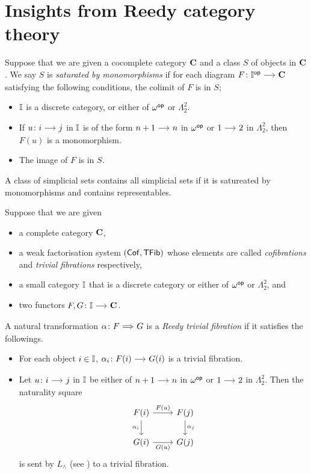 \documentclass[a4paper,  dvipsnames, 11pt]{amsart}
\begin{document}
\section{Insights from Reedy category theory}
\begin{definition}
	\label{defn:SatMono}
	Suppose that we are given a cocomplete category $\mathbf{C}$ and a class $S$ of objects in $\mathbf{C}$.
	We say $S$ is \emph{saturated by monomorphisms}
	if for each diagram $F\colon\dI^\op\arr\one{C}$ satisfying the following conditions,
	the colimit of $F$ is in $S$;
	\begin{itemize}
		\item %
			$\mathbb{I}$ is a discrete category, or either of
			$\omega^{\mathsf{op}}$ or $\Lambda^2_2$.
		\item %
			If $u\colon i\arr j$ in $\mathbb{I}$ is of the form $n+1\arr n$ in $\omega^{\mathsf{op}}$ or $1\arr 2$ in $\Lambda^2_2$,
			then $F(u)$ is a monomorphism.
		\item %
			The image of $F$ is in $S$.
		\qedhere %
	\end{itemize}
\end{definition}
\begin{fact}
	\label{fact:SatMono}
	A class of simplicial sets contains all simplicial sets
	if it is satureated by monomorphisms and contains representables.
\end{fact}
\begin{definition}
	\label{defn:ReedyTrivFib}
	Suppose that we are given
	\begin{itemize}
		\item %
			a complete category $\mathbf{C}$,
		\item %
			a weak factorisation system $(\mathsf{Cof},\mathsf{TFib})$
			whose elements are called \textit{cofibrations} and \textit{trivial fibrations} respectively,
		\item %
			a small category $\mathbb{I}$ that is a discrete category or either of $\omega^{\mathsf{op}}$ or $\Lambda^2_2$,
			and
		\item %
			two functors $F,G\colon\dI\arr\one{C}$.
	\end{itemize}
	A natural transformation $\alpha\colon F\arr[Rightarrow]G$
	is a
	\emph{Reedy trivial fibration}
	if it satisfies the followings.
	\begin{itemize}
		\item %
			For each object $i\in\mathbb{I}$, $\alpha_i\colon F(i)\arr G(i)$ is a trivial fibration.
		\item %
			Let $u\colon i\arr j$ in $\mathbb{I}$ be either of $n+1\arr n$ in $\omega^{\mathsf{op}}$ or $1\arr 2$ in $\Lambda^2_2$.
			Then the naturality square
			\[
				\begin{tikzcd}
					F(i)
					\ar[r,"F(u)"]
					\ar[d,"\alpha_i"']
						&
						F(j)
						\ar[d,"\alpha_j"]
					\\
					G(i)
					\ar[r,"G(u)"']
						&
						G(j)
				\end{tikzcd}
			\]
			is sent by $L_\land$ (see ) to a trivial fibration.
		\qedhere %
	\end{itemize}
\end{definition}
\end{document}
